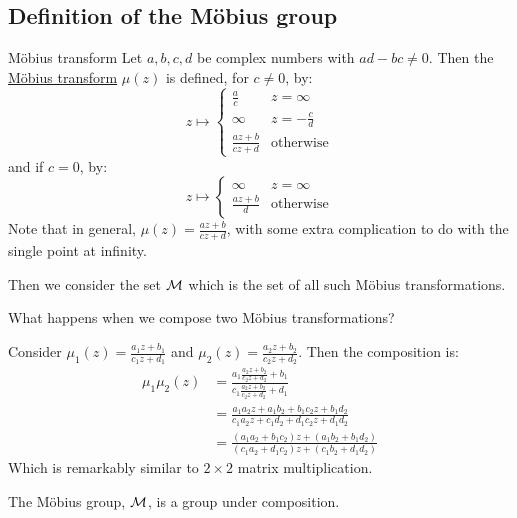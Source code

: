 \documentclass[../Main.tex]{subfiles}
\begin{document}
\subsection{Definition of the \texorpdfstring{M\"obius}{Mobius} group}
\begin{definition}{M\"obius transform}
    Let $a, b, c, d$ be complex numbers with $ad - bc \neq 0$. Then the \underline{M\"obius transform} $\mu(z)$ is defined, for $c \neq 0$, by:
    \begin{equation*}
        z \mapsto
        \begin{cases}
            \frac{a}{c} & z = \infty \\
            \infty & z = -\frac{c}{d} \\
            \frac{az + b}{cz + d} & \text{otherwise}
        \end{cases}
    \end{equation*}
    and if $c = 0$, by:
    \begin{equation*}
        z \mapsto
        \begin{cases}
            \infty & z = \infty \\
            \frac{az + b}{d} & \text{otherwise}
        \end{cases}
    \end{equation*}
    Note that in general, $\mu(z) = \frac{az + b}{cz + d}$, with some extra complication to do with the single point at infinity.
\end{definition}
Then we consider the set $\mathcal{M}$ which is the set of all such M\"obius transformations.\par
What happens when we compose two M\"obius transformations?\par
Consider $\mu_1(z) = \frac{a_1z + b_1}{c_1z + d_1}$ and $\mu_2(z) = \frac{a_2z + b_2}{c_2z + d_2}$. Then the composition is:
\begin{align*}
    \mu_1 \mu_2(z) &= \frac{a_1 \frac{a_2 z + b_2}{c_2 z + d_2} + b_1}{c_1 \frac{a_2 z + b_2}{c_2 z + d_2} + d_1} \\
    &= \frac{a_1 a_2 z + a_1 b_2 + b_1 c_2 z + b_1 d_2}{c_1 a_2 z + c_1 d_2 + d_1 c_2 z + d_1 d_2} \\
    &= \frac{(a_1 a_2 + b_1 c_2)z + (a_1 b_2 + b_1 d_2)}{(c_1 a_2 + d_1 c_2)z + (c_1 b_2 + d_1 d_2)}
\end{align*}
Which is remarkably similar to $2 \times 2$ matrix multiplication.
\begin{theorem}
    The M\"obius group, $\mathcal{M}$, is a group under composition.
    \label{thmMobiusGrp}
\end{theorem}
\end{document}
